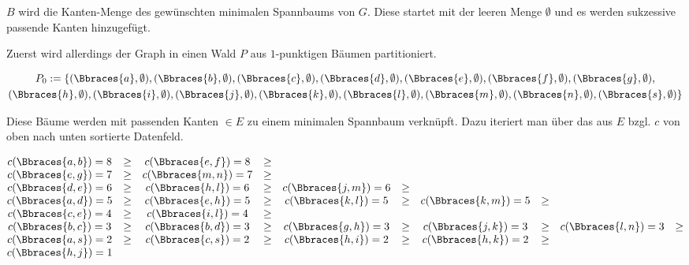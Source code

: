 \begin{solution}
\begin{enumerate}[label = \arabic*.]
    $B$ wird die Kanten-Menge des gewünschten minimalen Spannbaums von $G$.
    Diese startet mit der leeren Menge $\emptyset$ und es werden sukzessive passende Kanten hinzugefügt.

    Zuerst wird allerdings der Graph in einen Wald $P$ aus $1$-punktigen Bäumen partitioniert.

    \begin{multline*}
        P_0
        :=
        \{
            (\Bbraces{a}, \emptyset),
            (\Bbraces{b}, \emptyset),
            (\Bbraces{c}, \emptyset),
            (\Bbraces{d}, \emptyset),
            (\Bbraces{e}, \emptyset),
            (\Bbraces{f}, \emptyset),
            (\Bbraces{g}, \emptyset), \\
            (\Bbraces{h}, \emptyset),
            (\Bbraces{i}, \emptyset),
            (\Bbraces{j}, \emptyset),
            (\Bbraces{k}, \emptyset),
            (\Bbraces{l}, \emptyset),
            (\Bbraces{m}, \emptyset),
            (\Bbraces{n}, \emptyset),
            (\Bbraces{s}, \emptyset)
        \}
    \end{multline*}

    Diese Bäume werden mit passenden Kanten $\in E$ zu einem minimalen Spannbaum verknüpft.
    Dazu iteriert man über das aus $E$ bzgl. $c$ von oben nach unten sortierte Datenfeld.

    \begin{align*}
        \begin{matrix}
            c(\Bbraces{a, b}) = 8 & \geq & c(\Bbraces{e, f}) = 8 & \geq &                       &      &                       &      &                       &      \\
            c(\Bbraces{e, g}) = 7 & \geq & c(\Bbraces{m, n}) = 7 & \geq &                       &      &                       &      &                       &      \\
            c(\Bbraces{d, e}) = 6 & \geq & c(\Bbraces{h, l}) = 6 & \geq & c(\Bbraces{j, m}) = 6 & \geq &                       &      &                       &      \\
            c(\Bbraces{a, d}) = 5 & \geq & c(\Bbraces{e, h}) = 5 & \geq & c(\Bbraces{k, l}) = 5 & \geq & c(\Bbraces{k, m}) = 5 & \geq &                       &      \\
            c(\Bbraces{c, e}) = 4 & \geq & c(\Bbraces{i, l}) = 4 & \geq &                       &      &                       &      &                       &      \\
            c(\Bbraces{b, c}) = 3 & \geq & c(\Bbraces{b, d}) = 3 & \geq & c(\Bbraces{g, h}) = 3 & \geq & c(\Bbraces{j, k}) = 3 & \geq & c(\Bbraces{l, n}) = 3 & \geq \\
            c(\Bbraces{a, s}) = 2 & \geq & c(\Bbraces{c, s}) = 2 & \geq & c(\Bbraces{h, i}) = 2 & \geq & c(\Bbraces{h, k}) = 2 & \geq &                       &      \\
            c(\Bbraces{h, j}) = 1 &      &                       &      &                       &      &                       &      &                       &
        \end{matrix}
    \end{align*}


\end{enumerate}
\end{solution}
